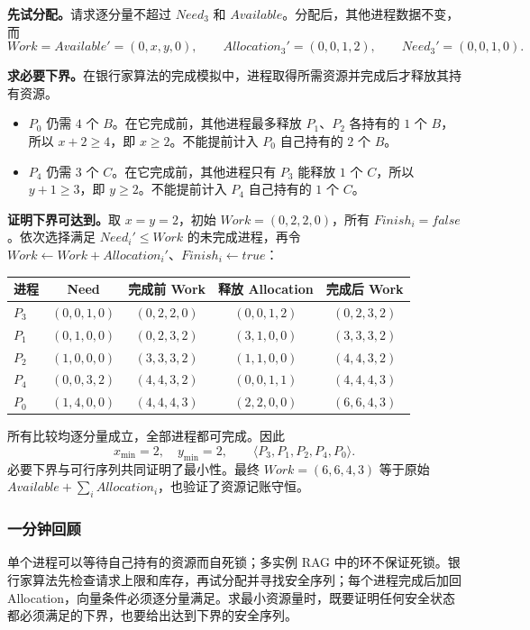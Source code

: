 \begin{checkedsolution}
\nopagebreak[4]
\textbf{先试分配。}请求逐分量不超过 $Need_3$ 和 $Available$。分配后，其他进程数据不变，而
\[
  Work=Available'=(0,x,y,0),\qquad
  Allocation_3'=(0,0,1,2),\qquad Need_3'=(0,0,1,0).
\]

\textbf{求必要下界。}在银行家算法的完成模拟中，进程取得所需资源并完成后才释放其持有资源。
\begin{itemize}
  \item $P_0$ 仍需 $4$ 个 $B$。在它完成前，其他进程最多释放 $P_1$、$P_2$ 各持有的 $1$ 个 $B$，所以 $x+2\ge4$，即 $x\ge2$。不能提前计入 $P_0$ 自己持有的 $2$ 个 $B$。
  \item $P_4$ 仍需 $3$ 个 $C$。在它完成前，其他进程只有 $P_3$ 能释放 $1$ 个 $C$，所以 $y+1\ge3$，即 $y\ge2$。不能提前计入 $P_4$ 自己持有的 $1$ 个 $C$。
\end{itemize}

\textbf{证明下界可达到。}取 $x=y=2$，初始 $Work=(0,2,2,0)$，所有 $Finish_i=false$。依次选择满足 $Need_i'\le Work$ 的未完成进程，再令 $Work\leftarrow Work+Allocation_i'$、$Finish_i\leftarrow true$：
\begin{center}
\small
\begin{tabular}{@{}lcccc@{}}
  \toprule
  进程 & Need & 完成前 Work & 释放 Allocation & 完成后 Work \\
  \midrule
  $P_3$ & $(0,0,1,0)$ & $(0,2,2,0)$ & $(0,0,1,2)$ & $(0,2,3,2)$ \\
  $P_1$ & $(0,1,0,0)$ & $(0,2,3,2)$ & $(3,1,0,0)$ & $(3,3,3,2)$ \\
  $P_2$ & $(1,0,0,0)$ & $(3,3,3,2)$ & $(1,1,0,0)$ & $(4,4,3,2)$ \\
  $P_4$ & $(0,0,3,2)$ & $(4,4,3,2)$ & $(0,0,1,1)$ & $(4,4,4,3)$ \\
  $P_0$ & $(1,4,0,0)$ & $(4,4,4,3)$ & $(2,2,0,0)$ & $(6,6,4,3)$ \\
  \bottomrule
\end{tabular}
\end{center}
所有比较均逐分量成立，全部进程都可完成。因此
\[
  \boxed{x_{\min}=2,\quad y_{\min}=2},\qquad
  \boxed{\langle P_3,P_1,P_2,P_4,P_0\rangle}.
\]
必要下界与可行序列共同证明了最小性。最终 $Work=(6,6,4,3)$ 等于原始 $Available+\sum_iAllocation_i$，也验证了资源记账守恒。
\end{checkedsolution}

\subsubsection*{一分钟回顾}

单个进程可以等待自己持有的资源而自死锁；多实例 RAG 中的环不保证死锁。银行家算法先检查请求上限和库存，再试分配并寻找安全序列；每个进程完成后加回 Allocation，向量条件必须逐分量满足。求最小资源量时，既要证明任何安全状态都必须满足的下界，也要给出达到下界的安全序列。
